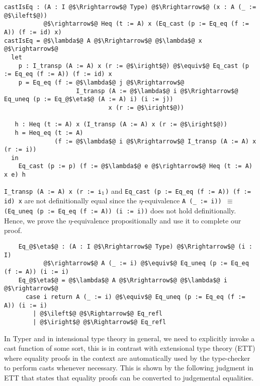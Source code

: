 \documentclass[12pt,twoside,maitrise]{dms}
\theoremstyle{definition}
\numberwithin{equation}{section}
\numberwithin{table}{chapter}
\numberwithin{figure}{chapter}
\newcommand\fn[1] {\texttt{#1}}
\begin{document}
\begin{verbatim}
castIsEq : (A : I @$\Rrightarrow$@ Type) @$\Rrightarrow$@ (x : A (_ := @$\ileft$@))
           @$\rightarrow$@ Heq (t := A) x (Eq_cast (p := Eq_eq (f := A)) (f := id) x)
castIsEq = @$\lambda$@ A @$\Rrightarrow$@ @$\lambda$@ x @$\rightarrow$@
  let
    p : I_transp (A := A) x (r := @$\iright$@) @$\equiv$@ Eq_cast (p := Eq_eq (f := A)) (f := id) x
    p = Eq_eq (f := @$\lambda$@ j @$\Rrightarrow$@
                    I_transp (A := @$\lambda$@ i @$\Rrightarrow$@ Eq_uneq (p := Eq_@$\eta$@ (A := A) i) (i := j))
                             x (r := @$\iright$@))

   h : Heq (t := A) x (I_transp (A := A) x (r := @$\iright$@))
   h = Heq_eq (t := A)
              (f := @$\lambda$@ i @$\Rrightarrow$@ I_transp (A := A) x (r := i))
  in
    Eq_cast (p := p) (f := @$\lambda$@ e @$\rightarrow$@ Heq (t := A) x e) h
\end{verbatim}


\fn{I_transp (A := A) x (r := $\texttt{i}_1$)} and \fn{Eq_cast (p := Eq_eq (f := A)) (f :=
  id) x} are not definitionally equal since the $\eta$-equivalence \fn{A (_ :=
  i)) $\equiv$ (Eq_uneq (p := Eq_eq (f := A)) (i := i))} does not hold
definitionally. Hence, we prove the $\eta$-equivalence propositionally and use
it to complete our proof.

\begin{verbatim}
    Eq_@$\eta$@ : (A : I @$\Rrightarrow$@ Type) @$\Rrightarrow$@ (i : I)
           @$\rightarrow$@ A (_ := i) @$\equiv$@ Eq_uneq (p := Eq_eq (f := A)) (i := i)
    Eq_@$\eta$@ = @$\lambda$@ A @$\Rrightarrow$@ @$\lambda$@ i @$\rightarrow$@
      case i return A (_ := i) @$\equiv$@ Eq_uneq (p := Eq_eq (f := A)) (i := i)
        | @$\ileft$@ @$\Rightarrow$@ Eq_refl
        | @$\iright$@ @$\Rightarrow$@ Eq_refl
\end{verbatim}


In Typer and in intensional type theory in general, we need to explicitly invoke
a cast function of some sort, this is in contrast with extensional type theory
(ETT)\cite{martin1982constructive} where equality proofs in the context are
automatically used by the type-checker to perform casts whenever necessary. This
is shown by the following judgment in ETT that states that equality proofs can
be converted to judgemental equalities.
\end{document}
